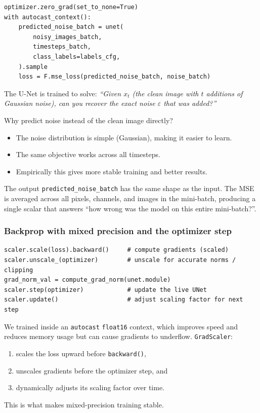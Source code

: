 \documentclass[11pt]{article}
\newcommand{\code}[1]{\texttt{#1}}
\newcommand{\xT}{x_t}
\newcommand{\eps}{\varepsilon}
\begin{document}
\begin{lstlisting}
optimizer.zero_grad(set_to_none=True)
with autocast_context():
    predicted_noise_batch = unet(
        noisy_images_batch,
        timesteps_batch,
        class_labels=labels_cfg,
    ).sample
    loss = F.mse_loss(predicted_noise_batch, noise_batch)
\end{lstlisting}

The U-Net is trained to solve: \emph{``Given $\xT$ (the clean image with $t$
additions of Gaussian noise), can you recover the exact noise $\eps$ that was
added?''}

Why predict noise instead of the clean image directly?
\begin{itemize}
  \item The noise distribution is simple (Gaussian), making it easier to learn.
  \item The same objective works across all timesteps.
  \item Empirically this gives more stable training and better results.
\end{itemize}

The output \code{predicted\_noise\_batch} has the same shape as the input.
The MSE is averaged across all pixels, channels, and images in the
mini-batch, producing a single scalar that answers ``how wrong was the model
on this entire mini-batch?''.

\subsubsection{Backprop with mixed precision and the optimizer step}

\begin{lstlisting}
scaler.scale(loss).backward()     # compute gradients (scaled)
scaler.unscale_(optimizer)        # unscale for accurate norms / clipping
grad_norm_val = compute_grad_norm(unet.module)
scaler.step(optimizer)            # update the live UNet
scaler.update()                   # adjust scaling factor for next step
\end{lstlisting}

We trained inside an \code{autocast} \code{float16} context, which improves
speed and reduces memory usage but can cause gradients to underflow.
\code{GradScaler}:
\begin{enumerate}
  \item scales the loss upward before \code{backward()},
  \item unscales gradients before the optimizer step, and
  \item dynamically adjusts its scaling factor over time.
\end{enumerate}
This is what makes mixed-precision training stable.
\end{document}
